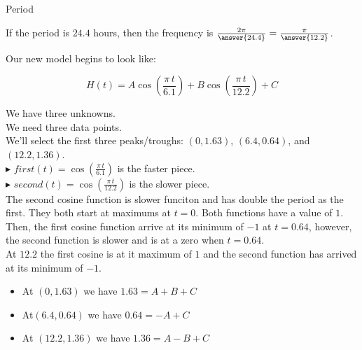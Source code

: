 \documentclass{ximera}
\begin{document}
\begin{question}  Period

If the period is $24.4$ hours, then the frequency is $\frac{2 \pi}{\answer{24.4}} = \frac{\pi}{\answer{12.2}}$.


\end{question}









Our new model begins to look like:

\[   H(t) = A \cos\left( \frac{\pi \, t}{6.1} \right) + B \cos\left( \frac{\pi \, t}{12.2} \right) + C       \]


We have three unknowns. \\

We need three data points. \\


We'll select the first three peaks/troughs:  $(0, 1.63)$, $(6.4, 0.64)$, and $(12.2, 1.36)$. \\



\textbf{\textcolor{blue!55!black}{$\blacktriangleright$}} $first(t) = \cos\left( \frac{\pi \, t}{6.1} \right)$ is the faster piece. \\


\textbf{\textcolor{blue!55!black}{$\blacktriangleright$}} $second(t) = \cos\left( \frac{\pi \, t}{12.2} \right)$ is the slower piece. \\




The second cosine function is slower funciton and has double the period as the first.  They both start at maximums at $t=0$.  Both functions have a value of $1$. \\

Then, the first cosine function arrive at its minimum of $-1$ at $t=0.64$, however, the second function is slower and is at a zero when $t=0.64$.  \\

At $12.2$ the first cosine is at it maximum of $1$ and the second function has arrived at its minimum of $-1$.






\begin{itemize}
\item At $(0, 1.63)$  we have $1.63 = A + B + C$
\item At$(6.4, 0.64)$ we have $0.64 = -A + C$
\item At $(12.2, 1.36)$  we have $1.36 = A - B + C$
\end{itemize}
\end{document}
